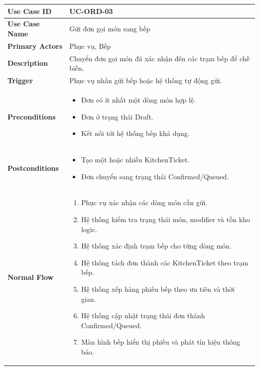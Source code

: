 \begin{longtable}{|p{4cm}|p{10cm}|}
\hline
\textbf{Use Case ID} & UC-ORD-03 \\ \hline
\textbf{Use Case Name} & Gửi đơn gọi món sang bếp \\ \hline
\textbf{Primary Actors} & Phục vụ, Bếp \\ \hline

\textbf{Description} & Chuyển đơn gọi món đã xác nhận đến các trạm bếp để chế biến. \\ \hline

\textbf{Trigger} & Phục vụ nhấn gửi bếp hoặc hệ thống tự động gửi. \\ \hline

\textbf{Preconditions} &
\begin{itemize}[leftmargin=*, noitemsep]
  \item Đơn có ít nhất một dòng món hợp lệ.
  \item Đơn ở trạng thái \textsf{Draft}.
  \item Kết nối tới hệ thống bếp khả dụng.
\end{itemize} \\ \hline

\textbf{Postconditions} &
\begin{itemize}[leftmargin=*, noitemsep]
  \item Tạo một hoặc nhiều \textsf{KitchenTicket}.
  \item Đơn chuyển sang trạng thái \textsf{Confirmed/Queued}.
\end{itemize} \\ \hline

\textbf{Normal Flow} &
\begin{enumerate}[leftmargin=*, noitemsep]
  \item Phục vụ xác nhận các dòng món cần gửi.
  \item Hệ thống kiểm tra trạng thái món, modifier và tồn kho logic.
  \item Hệ thống xác định trạm bếp cho từng dòng món.
  \item Hệ thống tách đơn thành các \textsf{KitchenTicket} theo trạm bếp.
  \item Hệ thống xếp hàng phiếu bếp theo ưu tiên và thời gian.
  \item Hệ thống cập nhật trạng thái đơn thành \textsf{Confirmed/Queued}.
  \item Màn hình bếp hiển thị phiếu và phát tín hiệu thông báo.
\end{enumerate} \\ \hline


\end{longtable}
